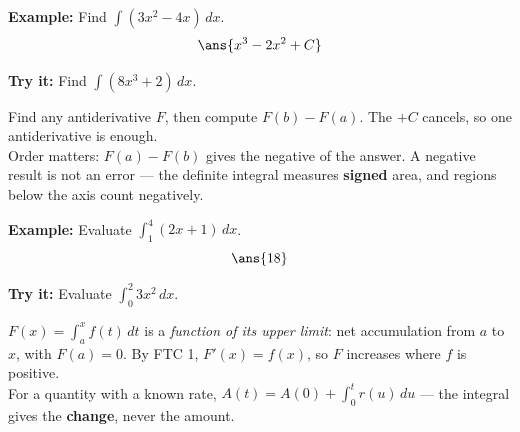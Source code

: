 \documentclass[12pt]{article}
\begin{document}
\begin{examplebox}
\textbf{Example:} Find $\displaystyle\int (3x^2 - 4x)\,dx$.
\[ \ans{x^3 - 2x^2 + C} \]
\end{examplebox}

\begin{tryitbox}
\textbf{Try it:} Find $\displaystyle\int (8x^3 + 2)\,dx$.\\[2pt]
\end{tryitbox}


\begin{formulabox}
Find any antiderivative $F$, then compute $F(b) - F(a)$. The $+C$ cancels, so
one antiderivative is enough.\\[2pt]
Order matters: $F(a) - F(b)$ gives the negative of the answer. A negative result
is not an error --- the definite integral measures \textbf{signed} area, and
regions below the axis count negatively.
\end{formulabox}

\begin{examplebox}
\textbf{Example:} Evaluate $\displaystyle\int_1^4 (2x+1)\,dx$.
\[ \ans{18} \]
\end{examplebox}

\begin{tryitbox}
\textbf{Try it:} Evaluate $\displaystyle\int_0^2 3x^2\,dx$.\\[2pt]
\end{tryitbox}


\begin{formulabox}
$F(x) = \int_a^x f(t)\,dt$ is a \emph{function of its upper limit}: net
accumulation from $a$ to $x$, with $F(a) = 0$. By FTC 1, $F'(x) = f(x)$, so $F$
increases where $f$ is positive.\\[2pt]
For a quantity with a known rate, $A(t) = A(0) + \int_0^t r(u)\,du$ --- the
integral gives the \textbf{change}, never the amount.
\end{formulabox}
\end{document}
